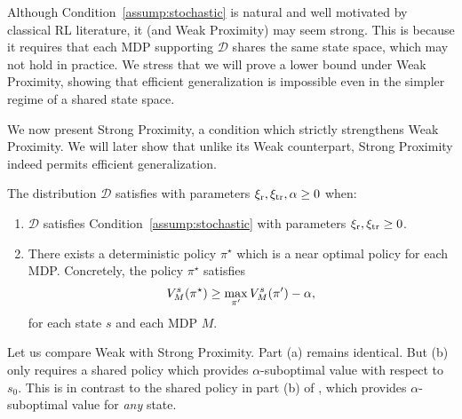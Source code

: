 \documentclass[11pt,twoside]{article}
\begin{document}
Although Condition~\ref{assump:stochastic} is natural and well motivated by classical RL literature, it (and Weak Proximity) may seem strong. This is because it requires that each MDP supporting $\mathcal{D}$ shares the same state space, which may not hold in practice. We stress that we will prove a lower bound under Weak Proximity, showing that efficient generalization is impossible even in the simpler regime of a shared state space.

We now present Strong Proximity, a condition which strictly strengthens Weak Proximity. We will later show that unlike its Weak counterpart, Strong Proximity indeed permits efficient generalization. 

\begin{condition}[\strprox{}]
\label{assump:upper_bound}
The distribution $\mathcal{D}$ satisfies \strprox{} with parameters $\operatorname{\xi_r}, \operatorname{\xi_{tr}}, \alpha \geq 0$ when:
\begin{enumerate}[label=(\alph*), leftmargin=*]
\item $\mathcal{D}$ satisfies Condition~\ref{assump:stochastic} with parameters $\operatorname{\xi_r}, \operatorname{\xi_{tr}} \geq 0$.
\item There exists a deterministic policy $\pi^\star$ which is a near optimal policy for each MDP. Concretely, the policy $\pi^\star$ satisfies
$$
V^{{s }}_{{M }}({\pi^\star}) \geq \max_{\pi'} V^{{s }}_{{M }}({\pi'}) - \operatorname{\alpha},
$$
for each state $s$ and each MDP $M$.
\begin{comment}
\item There exists an oracle $\oracle$, which takes as input a state $s$ and MDP $M$, and outputs $\approxV{s}{M}$ that satisfies
$$
\approxV{s}{M} \geq \max_{\pi'} \V{s}{M}{\pi'} - \solvesub,
$$
in a number of queries that is polynomial in $H$ and $\vert \ActSet \vert$.
\end{comment}
\end{enumerate}
\end{condition}

\noindent Let us compare Weak with Strong Proximity. Part (a) remains identical. But \weakprox{} (b) only requires a shared policy which provides $\alpha$-suboptimal value with respect to $s_0$. This is in contrast to the shared policy in part (b) of \strprox{}, which provides $\alpha$-suboptimal value for \emph{any} state.
\end{document}

